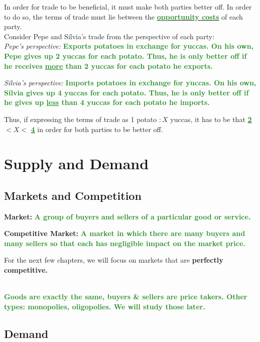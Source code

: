 \documentclass[11pt]{article}\usepackage[]{graphicx}\usepackage[]{color}
\theoremstyle{definition}
\newcommand{\blank}[1]{}
\newcommand{\ddp}[1]{{\textbf{\textcolor{ForestGreen}{#1}}}}
\newcommand{\dd}[1]{{\underline{\textbf{\textcolor{ForestGreen}{#1}}}}}
\newcommand{\defn}[1]{\textbf{#1}}
\begin{document}
	In order for trade to be beneficial, it must make both parties better off. In order to do so, the terms of trade must lie between the \dd{opportunity costs} of each party. 
	\\
	
	Consider Pepe and Silvia's trade from the perspective of each party:
	\\
	
	\textit{Pepe's perspective:}
	\ddp{Exports potatoes in exchange for yuccas. On his own, Pepe gives up 2 yuccas for each potato. Thus, he is only better off if he receives \underline{more} than 2 yuccas for each potato he exports. \\}
	\blank{} \blank{}
	
	\textit{Silvia's perspective:}
	\ddp{Imports potatoes in exchange for yuccas. On his own, Silvia gives up 4 yuccas for each potato. Thus, he is only better off if he gives up \underline{less} than 4 yuccas for each potato he imports.\\} 
	\blank{} \blank{}
	
	Thus, if expressing the terms of trade as 1 potato $: X$ yuccas, it has to be that \dd{2} $< X <$ \dd{4} in order for both parties to be better off.
	
	\newpage
	
	\section{Supply and Demand}
	
	\subsection{Markets and Competition}
	
	\defn{Market:} \ddp{A group of buyers and sellers of a particular good or service.\\}
	
	\defn{Competitive Market:} \ddp{A market in which there are many buyers and many sellers so that each has negligible impact on the market price.\\}
	
	For the next few chapters, we will focus on markets that are \textbf{perfectly competitive.} 

	\ddp{\\ Goods are exactly the same, buyers \& sellers are price takers. Other types: monopolies, oligopolies. We will study those later.}
	
	
	\subsection{Demand}
	
\end{document}
